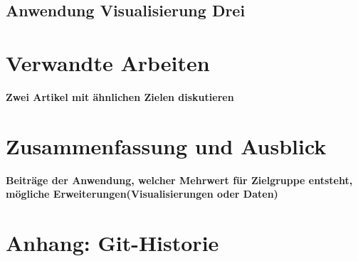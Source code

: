 \documentclass[usegeometry=true]{scrartcl}
\begin{document}
\subsection{Anwendung Visualisierung Drei}

\section{Verwandte Arbeiten}
\textbf{Zwei Artikel mit ähnlichen Zielen diskutieren}
\section{Zusammenfassung und Ausblick}

\textbf{Beiträge der Anwendung, welcher Mehrwert für Zielgruppe entsteht, mögliche Erweiterungen(Visualisierungen oder Daten)}

\newpage

\setcounter{page}{4}
\section*{Anhang: Git-Historie}

\printbibliography
\end{document}
